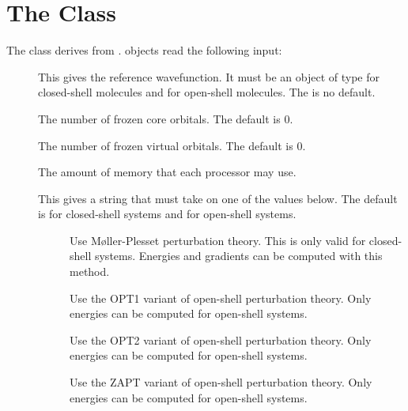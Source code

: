 

\section{The  Class}
\label{MBPT2}

The  class derives from .
 objects read the following input:

\begin{description}
  \item[] This gives the reference wavefunction.  It must
     be an object of type  for closed-shell molecules and
      for open-shell molecules.  The is no default.

  \item[] The number of frozen core orbitals.  The default
     is 0.

  \item[] The number of frozen virtual orbitals.  The default
     is 0.

  \item[] The amount of memory that each processor may use.

  \item[] This gives a string that must take on one of the
     values below.  The default is  for closed-shell systems
     and  for open-shell systems.

      \begin{description}

        \item[] Use M\o{}ller-Plesset perturbation theory.  This
           is only valid for closed-shell systems.  Energies and
           gradients can be computed with this method.

        \item[] Use the OPT1 variant of open-shell perturbation
           theory.  Only energies can be computed for open-shell systems.

        \item[] Use the OPT2 variant of open-shell perturbation
           theory.  Only energies can be computed for open-shell systems.

        \item[] Use the ZAPT variant of open-shell perturbation
           theory.  Only energies can be computed for open-shell systems.


\end{description}
\end{description}
